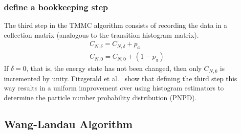\documentclass[letterpaper,twocolumn,amsmath,amssymb,pre,aps,10pt]{revtex4-1}
\begin{document}
\subsubsection{define a bookkeeping step}
The third step in the TMMC algorithm consists of recording the data in a collection
matrix (analogous to the transition histogram matrix).
\begin{align}
  C_{N,\delta} = C_{N,\delta} + p_{a}\\
  C_{N,0} = C_{N,0} +(1 - p_{a})
\end{align}
If $\delta=0$, that is, the energy state has not been changed, then only
$C_{N,0}$ is incremented by unity. Fitzgerald et al.~\cite{fitzgerald2000monte}
show that defining the third step this way results in a uniform improvement over
using histogram estimators to determine the particle number probability distribution (PNPD).

\subsection{Wang-Landau Algorithm}
\end{document}
